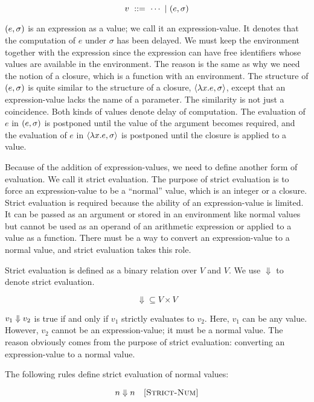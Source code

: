 \[ v\ ::=\ \cdots\ |\ \exprv{e}{\sigma} \]

$(e,\sigma)$ is an expression as a value; we call it an expression-value.
It denotes that the computation
of $e$ under $\sigma$ has been delayed. We must keep the environment together
with the expression since the expression can have free identifiers whose values
are available in the environment. The reason is the same as why we need the
notion of a closure, which is a function with an environment. The structure of
$(e,\sigma)$ is quite similar to the structure of a closure,
$\langle\lambda x.e,\sigma\rangle$, except that an expression-value lacks the name of a
parameter. The similarity is not just a coincidence. Both kinds of values denote
delay of computation. The evaluation of $e$ in $(e,\sigma)$ is postponed
until the value of the argument becomes required, and the evaluation of $e$ in
$\langle\lambda x.e,\sigma\rangle$ is postponed until the closure is applied to a value.

Because of the addition of expression-values, we need to define another form of
evaluation. We call it strict evaluation. The purpose of strict evaluation is to
force an expression-value to be a ``normal'' value, which is an integer or a
closure. Strict evaluation is required because the ability of an
expression-value is limited. It can be passed as an argument or stored in an
environment like normal values but cannot be used as an operand of an arithmetic
expression or applied to a value as a function. There must be a way to convert
an expression-value to a normal value, and strict evaluation takes this role.

Strict evaluation is defined as a binary relation over $V$ and $V$. We use
$\Downarrow$ to denote strict evaluation.

\[ \Downarrow\subseteq V\times V \]

$v_1\Downarrow v_2$ is true if and only if $v_1$ strictly evaluates to $v_2$.
Here, $v_1$ can be any value. However, $v_2$ cannot be an expression-value; it
must be a normal value. The reason obviously comes from the purpose of strict
evaluation: converting an expression-value to a normal value.

The following rules define strict evaluation of normal values:


\vspace{-1em}

\[
  n\Downarrow n
  \quad\textsc{[Strict-Num]}
\]

